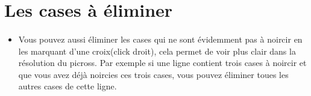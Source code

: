 \section{Les cases à éliminer}
	\paragraph{}
	\begin{itemize}
		\item Vous pouvez aussi éliminer les cases qui ne sont évidemment pas à noircir en les marquant d'une croix(click droit), cela permet de voir plus clair dans la résolution du picross. Par exemple si une ligne contient trois cases à noircir et que vous avez déjà noircies ces trois cases, vous pouvez éliminer toues les autres cases de cette ligne.
	\end{itemize}

